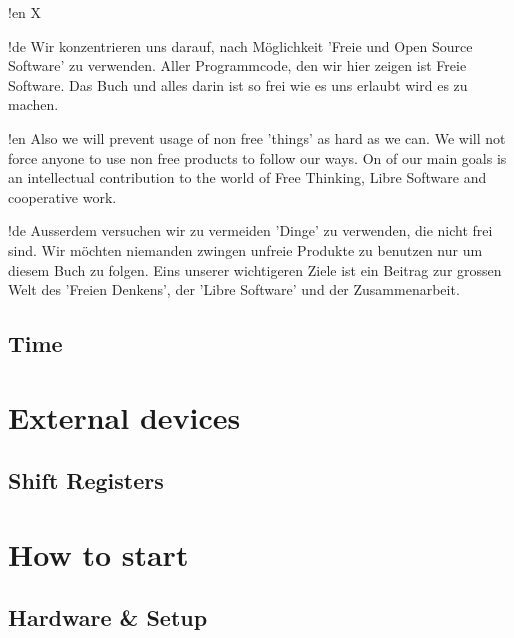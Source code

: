 \documentclass[twoside,12pt,authoryear,openright]{book}
\begin{document}
!en X

!de Wir konzentrieren uns darauf, nach Möglichkeit 'Freie und Open Source Software' zu verwenden. Aller Programmcode, den wir hier zeigen ist Freie Software. Das Buch und alles darin ist so frei wie es uns erlaubt wird es zu machen.



!en Also we will prevent usage of non free 'things' as hard as we can. We will not force anyone to use non free products to follow our ways. On of our main goals is an intellectual contribution to the world of Free Thinking, Libre Software and cooperative work.

!de Ausserdem versuchen wir zu vermeiden 'Dinge' zu verwenden, die nicht frei sind. Wir möchten niemanden zwingen unfreie Produkte zu benutzen nur um diesem Buch zu folgen. Eins unserer wichtigeren Ziele ist ein Beitrag zur grossen Welt des 'Freien Denkens', der 'Libre Software' und der Zusammenarbeit.










\chapter{Time}




\part{External devices}

\chapter{Shift Registers}




\part{How to start}

\chapter{Hardware & Setup}


\end{document}
